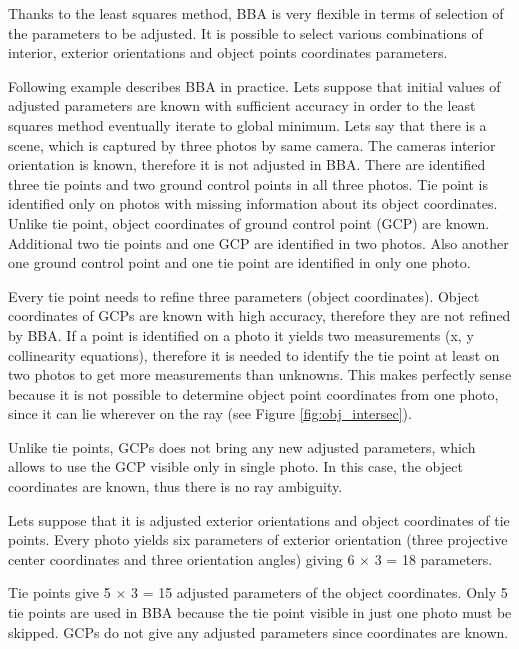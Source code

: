 \documentclass[a4paper,12pt]{article}
\begin{document}
Thanks to the least squares method, BBA is very flexible in terms of selection of the parameters to be adjusted. 
It is possible to select various combinations of interior, exterior orientations and object points coordinates parameters. 

Following example describes BBA in practice.
Lets suppose that initial values of adjusted parameters are known with sufficient accuracy in order to the least squares
method eventually iterate to global minimum.
Lets say that there is a scene, which is captured by three photos by same camera.
The cameras interior orientation is known, therefore it is not adjusted in BBA.
There are identified three tie points and two ground control points in all three photos.
Tie point is identified only on photos with missing information about its object coordinates.  
Unlike tie point, object coordinates of ground control point (GCP) are known.
Additional two tie points and one GCP are identified in two photos.
Also another one ground control point and one tie point are identified 
in only one photo. 


Every tie point needs to refine three parameters (object coordinates). 
Object coordinates of GCPs are known with high accuracy, therefore they are not refined by BBA. 
If a point is identified on a photo it yields two measurements (x, y collinearity equations), 
therefore it is needed to identify the tie point at least on two photos to get more measurements 
than unknowns. This makes perfectly sense because it is not possible to determine object point coordinates from one photo,
since it can lie wherever on the ray (see Figure \ref{fig:obj_intersec}).

Unlike tie points, GCPs does not bring any new adjusted parameters, which 
allows to use the GCP visible only in single photo. In this case, the object coordinates 
are known, thus there is no ray ambiguity. 

Lets suppose that it is adjusted exterior orientations and object coordinates of tie points.  
Every photo yields six parameters of exterior orientation (three projective center coordinates and three orientation angles) 
 giving 6 $\times$ 3 = 18 parameters. 

Tie points give 5 $\times$ 3 = 15 adjusted parameters of the object coordinates. 
Only 5 tie points are used in BBA because the tie point visible in just one photo must be skipped.
GCPs do not give any adjusted parameters since coordinates are known.
\end{document}
